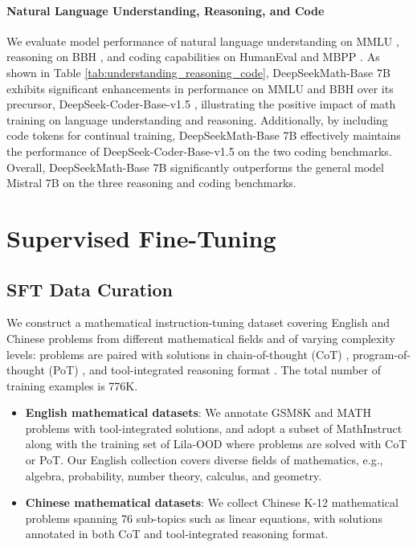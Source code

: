 \endgroup

\paragraph{Natural Language Understanding, Reasoning, and Code}

We evaluate model performance of natural language understanding on MMLU \citep{mmlu}, reasoning on BBH \citep{bbh}, and coding capabilities on HumanEval \citep{codex} and MBPP \citep{mbpp}. As shown in Table \ref{tab:understanding_reasoning_code}, DeepSeekMath-Base 7B exhibits significant enhancements in performance on MMLU and BBH over its precursor, DeepSeek-Coder-Base-v1.5 \citep{deepseek-coder}, illustrating the positive impact of math training on language understanding and reasoning. Additionally, by including code tokens for continual training, DeepSeekMath-Base 7B effectively maintains the performance of DeepSeek-Coder-Base-v1.5 on the two coding benchmarks. Overall, DeepSeekMath-Base 7B significantly outperforms the general model Mistral 7B \citep{mistral} on the three reasoning and coding benchmarks.

\section{Supervised Fine-Tuning}

\subsection{SFT Data Curation}

We construct a mathematical instruction-tuning dataset covering English and Chinese problems from different mathematical fields and of varying complexity levels: problems are paired with solutions in chain-of-thought (CoT) \citep{cot}, program-of-thought (PoT) \citep{pot,pal}, and tool-integrated reasoning format \citep{tora}. The total number of training examples is 776K.

\begin{itemize}[topsep=0pt]
    \item \textbf{English mathematical datasets}: We annotate GSM8K and MATH problems with tool-integrated solutions, and adopt a subset of MathInstruct \citep{MathInstruct} along with the training set of Lila-OOD \citep{lila} where problems are solved with CoT or PoT. Our English collection covers diverse fields of mathematics, e.g., algebra, probability, number theory, calculus, and geometry.
    \item \textbf{Chinese mathematical datasets}: We collect Chinese K-12 mathematical problems spanning 76 sub-topics such as linear equations, with solutions annotated in both CoT and tool-integrated reasoning format.
\end{itemize}

